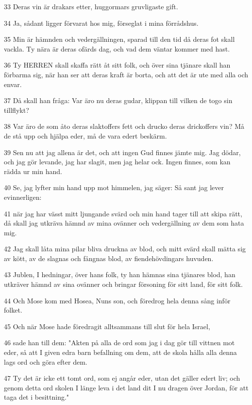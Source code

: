 \par 33 Deras vin är drakars etter, huggormars gruvligaste gift.
\par 34 Ja, sådant ligger förvarat hos mig, förseglat i mina förrådshus.
\par 35 Min är hämnden och vedergällningen, sparad till den tid då deras fot skall vackla. Ty nära är deras ofärds dag, och vad dem väntar kommer med hast.
\par 36 Ty HERREN skall skaffa rätt åt sitt folk, och över sina tjänare skall han förbarma sig, när han ser att deras kraft är borta, och att det är ute med alla och envar.
\par 37 Då skall han fråga: Var äro nu deras gudar, klippan till vilken de togo sin tillflykt?
\par 38 Var äro de som åto deras slaktoffers fett och drucko deras drickoffers vin? Må de stå upp och hjälpa eder, må de vara edert beskärm.
\par 39 Sen nu att jag allena är det, och att ingen Gud finnes jämte mig. Jag dödar, och jag gör levande, jag har slagit, men jag helar ock. Ingen finnes, som kan rädda ur min hand.
\par 40 Se, jag lyfter min hand upp mot himmelen, jag säger: Så sant jag lever evinnerligen:
\par 41 när jag har vässt mitt ljungande svärd och min hand tager till att skipa rätt, då skall jag utkräva hämnd av mina ovänner och vedergällning av dem som hata mig.
\par 42 Jag skall låta mina pilar bliva druckna av blod, och mitt svärd skall mätta sig av kött, av de slagnas och fångnas blod, av fiendehövdingars huvuden.
\par 43 Jublen, I hedningar, över hans folk, ty han hämnas sina tjänares blod, han utkräver hämnd av sina ovänner och bringar försoning för sitt land, för sitt folk.
\par 44 Och Mose kom med Hosea, Nuns son, och föredrog hela denna sång inför folket.
\par 45 Och när Mose hade föredragit alltsammans till slut för hela Israel,
\par 46 sade han till dem: "Akten på alla de ord som jag i dag gör till vittnen mot eder, så att I given edra barn befallning om dem, att de skola hålla alla denna lags ord och göra efter dem.
\par 47 Ty det är icke ett tomt ord, som ej angår eder, utan det gäller edert liv; och genom detta ord skolen I länge leva i det land dit I nu dragen över Jordan, för att taga det i besittning."
